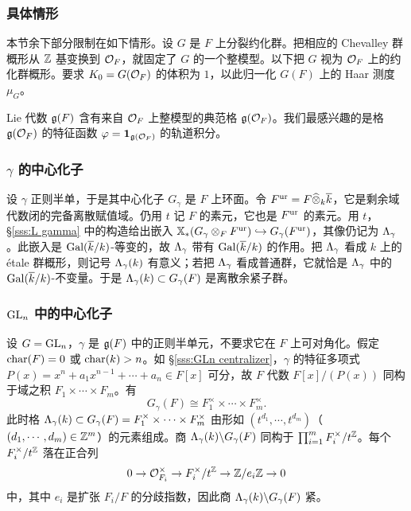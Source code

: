 \subsubsection{具体情形} 本节余下部分限制在如下情形。设 $G$ 是 $F$ 上分裂约化群。把相应的 Chevalley 群概形从 $\mathbb{Z}$ 基变换到 $\mathcal{O}_{F}$，就固定了 $G$ 的一个整模型。以下把 $G$ 视为 $\mathcal{O}_{F}$ 上的约化群概形。要求 $K_{0}=G(\mathcal{O}_{F})$ 的体积为 $1$，以此归一化 $G(F)$ 上的 Haar 测度 $\mu_{G}$。

Lie 代数 $\mathfrak{g}(F)$ 含有来自 $\mathcal{O}_{F}$ 上整模型的典范格 $\mathfrak{g}(\mathcal{O}_{F})$。我们最感兴趣的是格 $\mathfrak{g}(\mathcal{O}_{F})$ 的特征函数 $\varphi=\mathbf{1}_{\mathfrak{g}(\mathcal{O}_{F})}$ 的轨道积分。

\subsubsection{$\gamma$ 的中心化子} 设 $\gamma$ 正则半单，于是其中心化子 $G_{\gamma}$ 是 $F$ 上环面。令 $F^{\textup{ur}}=F\widehat{\otimes}_{k}\overline{k}$，它是剩余域代数闭的完备离散赋值域。仍用 $t$ 记 $F$ 的素元，它也是 $F^{\textup{ur}}$ 的素元。用 $t$，\S\ref{sss:L gamma} 中的构造给出嵌入 $\mathbb{X}_*(G_{\gamma}\otimes_{F}F^{\textup{ur}})\hookrightarrow  G_{\gamma}(F^{\textup{ur}})$，其像仍记为 $\Lambda_{\gamma}$。此嵌入是 $\textup{Gal}(\overline{k}/k)$-等变的，故 $\Lambda_{\gamma}$ 带有 $\textup{Gal}(\overline{k}/k)$ 的作用。把 $\Lambda_{\gamma}$ 看成 $k$ 上的 étale 群概形，则记号 $\Lambda_{\gamma}(k)$ 有意义；若把 $\Lambda_{\gamma}$ 看成普通群，它就恰是 $\Lambda_{\gamma}$ 中的 $\textup{Gal}(\overline{k}/k)$-不变量。于是 $\Lambda_{\gamma}(k)\subset G_{\gamma}(F)$ 是离散余紧子群。

\subsubsection{$\textup{GL}_{n}$ 中的中心化子}\label{sss:GLn orb} 设 $G=\textup{GL}_{n}$，$\gamma$ 是 $\mathfrak{g}(F)$ 中的正则半单元，不要求它在 $F$ 上可对角化。假定 $\textup{char}(F)=0$ 或 $\textup{char}(k)>n$。如 \S\ref{sss:GLn centralizer}，$\gamma$ 的特征多项式 $P(x)=x^{n}+a_{1}x^{n-1}+\cdots+a_{n}\in F[x]$ 可分，故 $F$ 代数 $F[x]/(P(x))$ 同构于域之积 $F_{1}\times \cdots \times F_{m}$。有
\begin{equation*}
G_{\gamma}(F)\cong F^{\times}_{1}\times\cdots\times F^{\times}_{m}.
\end{equation*}
此时格 $\Lambda_{\gamma}(k)\subset G_{\gamma}(F)=F^{\times}_{1}\times\cdots\times F^{\times}_{m}$ 由形如 $(t^{d_{1}},\cdots, t^{d_{m}})$（$(d_{1},\cdots, d_{m})\in\mathbb{Z}^{m}$）的元素组成。商 $\Lambda_{\gamma}(k)\backslash G_{\gamma}(F)$ 同构于 $\prod_{i=1}^{m}F^{\times}_{i}/t^{\mathbb{Z}}$。每个 $F^{\times}_{i}/t^{\mathbb{Z}}$ 落在正合列
\begin{equation}\label{Fi seq}
0\to \mathcal{O}^{\times}_{F_{i}}\to F^{\times}_{i}/t^{\mathbb{Z}}\to \mathbb{Z}/e_{i}\mathbb{Z}\to 0
\end{equation}
中，其中 $e_{i}$ 是扩张 $F_{i}/F$ 的分歧指数，因此商 $\Lambda_{\gamma}(k)\backslash G_{\gamma}(F)$ 紧。

